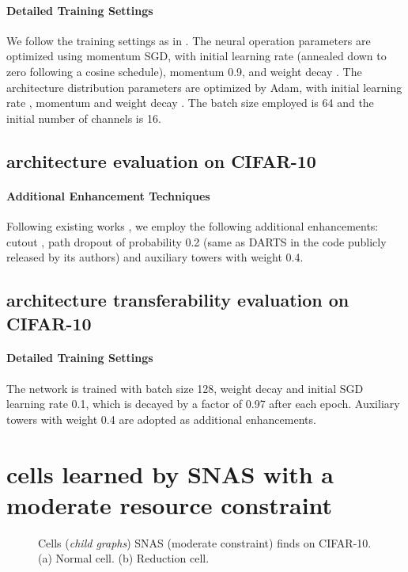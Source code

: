 \documentclass{article} \usepackage{iclr2019_conference,times}
\begin{document}
\paragraph{Detailed Training Settings}

We follow the training settings as in \citet{liu2018darts}. The neural operation parameters  are optimized using momentum SGD, with initial learning rate  (annealed down to zero following a cosine schedule), momentum 0.9, and weight decay . The architecture distribution parameters  are optimized by Adam, with initial learning rate , momentum  and weight decay . The batch size employed is 64 and the initial number of channels is 16.

\subsection{architecture evaluation on CIFAR-10}

\paragraph{Additional Enhancement Techniques}

Following existing works \citep{zoph2017learning, liu2017progressive, pham2018efficient, real2018regularized, liu2018darts}, we employ the following additional enhancements: cutout \citep{devries2017improved}, path dropout of probability 0.2 (same as DARTS in the code publicly released by its authors) and auxiliary towers with weight 0.4.

\subsection{architecture transferability evaluation on CIFAR-10}

\paragraph{Detailed Training Settings}

The network is trained with batch size 128, weight decay  and initial SGD learning rate 0.1, which is decayed by a factor of 0.97 after each epoch. Auxiliary towers with weight 0.4 are adopted as additional enhancements.

\section{cells learned by SNAS with a moderate resource constraint}

\begin{figure}[h]
  \centering
  \caption{Cells (\textit{child graphs}) SNAS (moderate constraint) finds on CIFAR-10. (a) Normal cell. (b) Reduction cell.}
  \label{fig:normal_reduction_moderate}
\end{figure}
\end{document}
